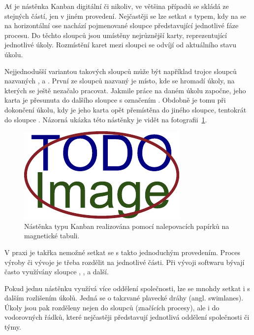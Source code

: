 Ať je nástěnka Kanban digitální či nikoliv, ve většina případů se skládá ze stejných částí, jen v jiném provedení. Nejčastěji se lze setkat s typem, kdy na se na horizontální ose nachází pojmenované sloupce představující jednotlivé fáze procesu. Do těchto sloupců jsou umístěny nejrůznější karty, reprezentující jednotlivé úkoly. Rozmístění karet mezi sloupci se odvíjí od aktuálního stavu úkolu.

Nejjednodušší variantou takových sloupců může být například trojce sloupců nazvaných ,  a . První ze sloupců nazvaný  je místo, kde se hromadí úkoly, na kterých se ještě nezačalo pracovat. Jakmile práce na daném úkolu započne, jeho karta je přesunuta do dalšího sloupce s označením . Obdobně je tomu při dokončení úkolu, kdy je jeho karta opět přemístěna do jiného sloupce, tentokrát do sloupce . Názorná ukázka této nástěnky je vidět na fotografii~\ref{img:kanban-whiteboard}.

\begin{figure}[H]
	\centering
	\includegraphics[width=\textwidth]{obrazky-figures/placeholder.pdf}
	\caption{Nástěnka typu Kanban realizována pomocí nalepovacích papírků na magnetické tabuli.}
	\label{img:kanban-whiteboard}
\end{figure}

V praxi je takřka nemožné setkat se s takto jednoduchým provedením. Proces výroby či vývoje je třeba rozdělit na jednotlivé části. Při vývoji softwaru bývají často využívány sloupce , ,  a další.  

Pokud jednu nástěnku využívá více oddělení společnosti, lze se mnohdy setkat i s dalším rozlišením úkolů. Jedná se o takzvané plavecké dráhy (angl. swimlanes). Úkoly jsou pak rozděleny nejen do sloupců (značících procesy), ale i do vodorovných řádků, které nejčastěji představují jednotlivá oddělení společnosti či týmy. 

